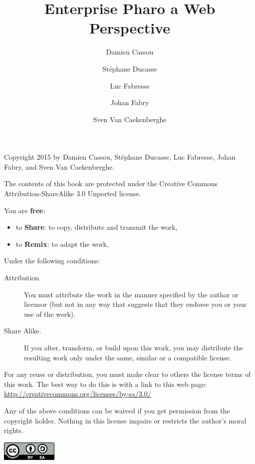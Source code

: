 \documentclass[10pt,twoside,english,showtrims]{support/latex/sbabook/sbabook}
\title{Enterprise Pharo\titlebreak{:} a Web Perspective}
\author{
    Damien Cassou \and
    Stéphane Ducasse \and
    Luc Fabresse \and
    Johan Fabry \and
    Sven Van Caekenberghe}
\date{\gitdate\titlebreak[\smallskip]{ -- }\protect\gitCommitInfo}
\begin{document}
{%
  \pagestyle{titlingpage}

  \maketitle

  \cleartoverso
  \small

  Copyright 2015 by Damien Cassou, Stéphane Ducasse, Luc Fabresse, Johan Fabry,
  and Sven Van Caekenberghe.

  The contents of this book are protected under the Creative Commons
  Attribution-ShareAlike 3.0 Unported license.

  You are \textbf{free}:
  \begin{itemize}
  \item to \textbf{Share}: to copy, distribute and transmit the work,
  \item to \textbf{Remix}: to adapt the work,
  \end{itemize}

  Under the following conditions:
  \begin{description}
  \item[Attribution.] You must attribute the work in the manner specified by the
    author or licensor (but not in any way that suggests that they endorse you
    or your use of the work).
  \item[Share Alike.] If you alter, transform, or build upon this work, you may
    distribute the resulting work only under the same, similar or a compatible
    license.
  \end{description}

  For any reuse or distribution, you must make clear to others the
  license terms of this work. The best way to do this is with a link to
  this web page: \\
  \url{http://creativecommons.org/licenses/by-sa/3.0/}

  Any of the above conditions can be waived if you get permission from
  the copyright holder. Nothing in this license impairs or restricts the
  author's moral rights.

  \begin{Center}
    \includegraphics[width=0.2\textwidth]{support/latex/CreativeCommons-BY-SA.pdf}
  \end{Center}

}
\end{document}
